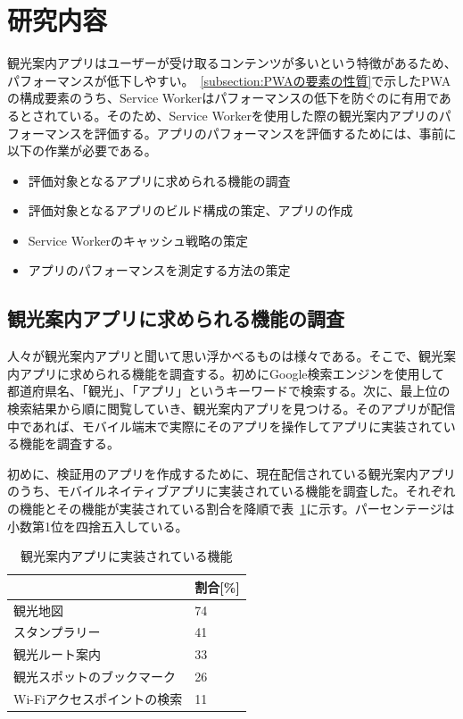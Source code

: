 \section{研究内容}
\label{section:研究内容}
観光案内アプリはユーザーが受け取るコンテンツが多いという特徴があるため、パフォーマンスが低下しやすい。~\autoref{subsection:PWAの要素の性質}で示したPWAの構成要素のうち、Service Workerはパフォーマンスの低下を防ぐのに有用であるとされている。そのため、Service Workerを使用した際の観光案内アプリのパフォーマンスを評価する。アプリのパフォーマンスを評価するためには、事前に以下の作業が必要である。
\begin{itemize}
    \item 評価対象となるアプリに求められる機能の調査
    \item 評価対象となるアプリのビルド構成の策定、アプリの作成
    \item Service Workerのキャッシュ戦略の策定
    \item アプリのパフォーマンスを測定する方法の策定
\end{itemize}
\subsection{観光案内アプリに求められる機能の調査}
\label{subsubsection:観光案内アプリに求められる機能の調査}
人々が観光案内アプリと聞いて思い浮かべるものは様々である。そこで、観光案内アプリに求められる機能を調査する。初めにGoogle検索エンジンを使用して都道府県名、「観光」、「アプリ」というキーワードで検索する。次に、最上位の検索結果から順に閲覧していき、観光案内アプリを見つける。そのアプリが配信中であれば、モバイル端末で実際にそのアプリを操作してアプリに実装されている機能を調査する。

初めに、検証用のアプリを作成するために、現在配信されている観光案内アプリのうち、モバイルネイティブアプリに実装されている機能を調査した。それぞれの機能とその機能が実装されている割合を降順で表~\ref{table:観光案内アプリに実装されている機能}に示す。パーセンテージは小数第1位を四捨五入している。
\begin{table}
  \caption{観光案内アプリに実装されている機能}
  \label{table:観光案内アプリに実装されている機能}
  \centering
  \begin{tabular}{|p{15em}|p{10em}|}
    \hline
    & 割合[\%] \\ \hline
    観光地図 & 74 \\ \hline
    スタンプラリー & 41\\ \hline
    観光ルート案内 & 33\\ \hline
    観光スポットのブックマーク & 26\\ \hline
    Wi-Fiアクセスポイントの検索 & 11 \\ \hline
  \end{tabular}
\end{table}

